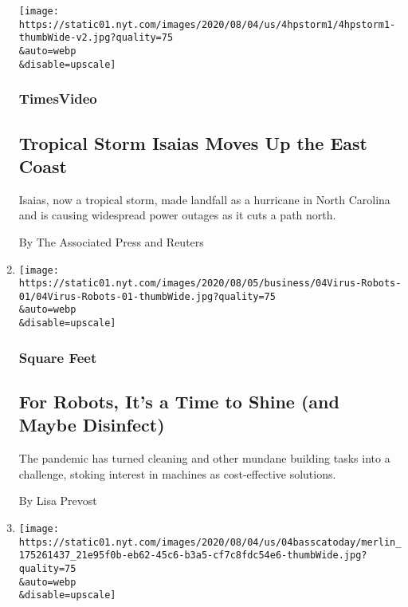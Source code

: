 \begin{enumerate}
  \texttt{[image: https://static01.nyt.com/images/2020/08/04/us/4hpstorm1/4hpstorm1-thumbWide-v2.jpg?quality=75\\\&auto=webp\\\&disable=upscale]}

  \hypertarget{timesvideo-2}{%
  \subsubsection{TimesVideo}\label{timesvideo-2}}

  \hypertarget{tropical-storm-isaias-moves-up-the-east-coast}{%
  \subsection{Tropical Storm Isaias Moves Up the East
  Coast}\label{tropical-storm-isaias-moves-up-the-east-coast}}

  Isaias, now a tropical storm, made landfall as a hurricane in North
  Carolina and is causing widespread power outages as it cuts a path
  north.

  By The Associated Press and Reuters
\item
  \href{/2020/08/04/business/robot-cleaning-coronavirus.html}{}

  \texttt{[image: https://static01.nyt.com/images/2020/08/05/business/04Virus-Robots-01/04Virus-Robots-01-thumbWide.jpg?quality=75\\\&auto=webp\\\&disable=upscale]}

  \hypertarget{square-feet}{%
  \subsubsection{Square Feet}\label{square-feet}}

  \hypertarget{for-robots-its-a-time-to-shine-and-maybe-disinfect}{%
  \subsection{For Robots, It's a Time to Shine (and Maybe
  Disinfect)}\label{for-robots-its-a-time-to-shine-and-maybe-disinfect}}

  The pandemic has turned cleaning and other mundane building tasks into
  a challenge, stoking interest in machines as cost-effective solutions.

  By Lisa Prevost
\item
  \href{/2020/08/04/us/biden-vp-karen-bass-kamala-harris.html}{}

  \texttt{[image: https://static01.nyt.com/images/2020/08/04/us/04basscatoday/merlin\_175261437\_21e95f0b-eb62-45c6-b3a5-cf7c8fdc54e6-thumbWide.jpg?quality=75\\\&auto=webp\\\&disable=upscale]}


\end{enumerate}

